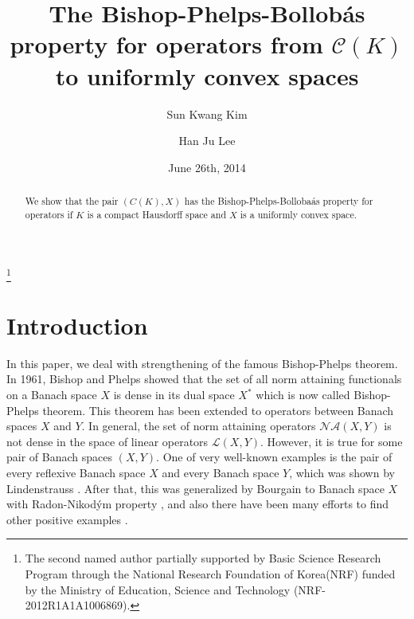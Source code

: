 \documentclass[a4paper]{amsart}
\theoremstyle{plain}
\theoremstyle{definition}
\begin{document}
\title[The Bishop-Phelps-Bollob\'as property for operators from $\mathcal{C}(K)$]{The Bishop-Phelps-Bollob\'as property for operators from $\mathcal{C}(K)$  to uniformly convex spaces}

\author[Kim]{Sun Kwang Kim}
\address[Kim]{Department of Mathematics, Kyonggi University, Suwon 443-760, Republic of Korea}

\author[Lee]{Han Ju Lee}
\address[Lee]{Department of Mathematics Education,
Dongguk University - Seoul, 100-715 Seoul, Republic of Korea}

\thanks{The second named author partially supported by Basic Science Research Program through the National Research Foundation of Korea(NRF) funded by the Ministry of Education, Science and Technology (NRF-2012R1A1A1006869).}



\begin{abstract} We show that the pair $(C(K),X)$ has the Bishop-Phelps-Bolloba\'as property for operators if $K$ is a compact Hausdorff space and $X$ is a uniformly convex space.
\end{abstract}

\date{June 26th, 2014}

\maketitle

\section{Introduction}
In this paper, we deal with strengthening of the famous Bishop-Phelps theorem. In 1961, Bishop and Phelps \cite{BP} showed that the set of all norm attaining functionals on a Banach space $X$ is dense in its dual space $X^*$ which is now called Bishop-Phelps theorem. This theorem has been extended to operators between Banach spaces $X$ and $Y$. In general, the set of norm attaining operators $\mathcal{NA}(X,Y)$ is not dense in the space of linear operators $\mathcal{L}(X,Y)$. However, it is true for some pair of Banach spaces $(X,Y)$. One of very well-known examples is the pair of every reflexive Banach space $X$ and every Banach space $Y$, which was shown by Lindenstrauss \cite{L}. After that, this was generalized by Bourgain to Banach space $X$ with Radon-Nikod\'ym property \cite {Bou}, and also there have been many efforts to find other positive examples \cite{CKlush, CK2, CLS1, FP, JoWo, S, U}.
\end{document}
